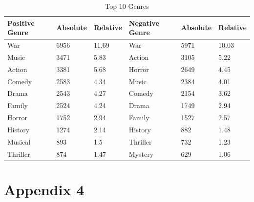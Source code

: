 \documentclass[
10pt, %
a4paper, %
oneside, %
headinclude,footinclude, %
] {book}%
\begin{document}
\begin{table}[hbtp]
\centering
\caption{Top 10 Genres}
\label{Table 10}
\begin{tabular}{@{}llllll@{}}
\toprule
Positive Genre & Absolute & Relative & Negative Genre & Absolute & Relative \\ \midrule
War            & 6956       & 11.69       & War            & 5971       & 10.03        \\
Music          & 3471       & 5.83       & Action         & 3105       & 5.22        \\
Action         & 3381       & 5.68       & Horror         & 2649       & 4.45        \\
Comedy         & 2583       & 4.34        & Music          & 2384       & 4.01        \\
Drama          & 2543       & 4.27        & Comedy         & 2154       & 3.62        \\
Family         & 2524       & 4.24        & Drama          & 1749       & 2.94         \\
Horror         & 1752       & 2.94        & Family         & 1527       & 2.57        \\
History        & 1274       & 2.14        & History        & 882        & 1.48        \\
Musical        & 893        & 1.5        & Thriller       & 732        & 1.23        \\
Thriller       & 874        & 1.47        & Mystery        & 629        & 1.06       \\ \bottomrule
\end{tabular}
\end{table}

\chapter*{Appendix 4}
\end{document}
